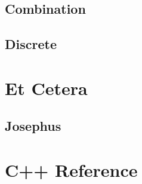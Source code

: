 \documentclass[10pt,a4paper,twocolumn]{extarticle}
\begin{document}
	\subsection{Combination}
		
	\subsection{Discrete}
		

\section{Et Cetera}
	\subsection{Josephus}
	

\section{C++ Reference}
	
\end{document}
